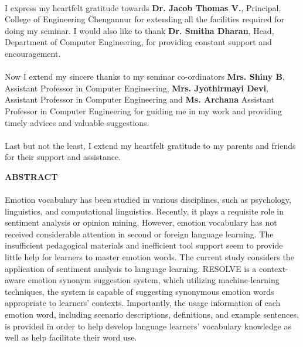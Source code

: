 \documentclass[a4paper,12pt,oneside]{article}
\begin{document}
\paragraph{}
I express my heartfelt gratitude towards \textbf{Dr. Jacob Thomas V.}, Principal, College
of Engineering Chengannur for extending all the facilities required for doing my seminar.
I would also like to thank \textbf{Dr. Smitha Dharan}, Head, Department of Computer
Engineering, for providing constant support and encouragement.
\paragraph{}
Now I extend my sincere thanks to my seminar co-ordinators \textbf{Mrs. Shiny B}, Assistant
Professor in Computer Engineering, \textbf{Mrs. Jyothirmayi Devi}, Assistant
Professor in Computer Engineering and \textbf{Ms. Archana} Assistant Professor in Computer Engineering for guiding me in my work and providing timely
advices and valuable suggestions.
\paragraph{}
Last but not the least, I extend my heartfelt gratitude to my parents and friends for
their support and assistance.	

\newpage
\begin{center}
\large{\textbf{ABSTRACT}}
\end{center}
\vspace{4ex}
\paragraph{}
Emotion vocabulary has been studied in various disciplines, such as psychology, linguistics, and computational linguistics. Recently, it plays a requisite role in sentiment analysis or opinion mining. However, emotion vocabulary has not received considerable attention in second or foreign language learning. The insufficient pedagogical materials and inefficient tool support seem to provide little help for learners to master emotion words. The current study considers the application of sentiment analysis to language learning. RESOLVE is a context-aware emotion synonym suggestion system, which utilizing machine-learning techniques, the system is capable of suggesting synonymous emotion words appropriate to learners’ contexts. Importantly, the usage information of each emotion word, including scenario descriptions, definitions, and example sentences, is provided in order to help develop language learners’ vocabulary knowledge as well as help facilitate their word use. 
\end{document}
